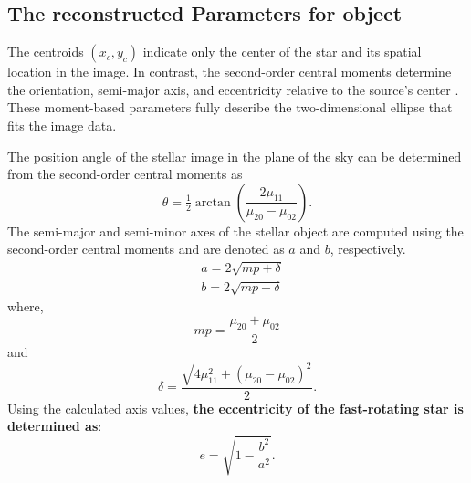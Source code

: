 \subsection{The reconstructed Parameters for object}
The centroids \((x_c, y_c)\) indicate only the center of the star and its spatial location in the image. In contrast, the second-order central moments determine the orientation, semi-major axis, and eccentricity relative to the source's center \citep{teague1980image}. These moment-based parameters fully describe the two-dimensional ellipse that fits the image data.

The position angle of the stellar image in the plane of the sky can be determined from the second-order central moments as
\begin{equation}
	\theta = \tfrac{1}{2}\arctan \left(\frac{2\mu_{11}}{\mu_{20} - \mu_{02}}\right).
	\label{eqn:orn}
\end{equation}
The semi-major and semi-minor axes of the stellar object are computed using the second-order central moments and are denoted as \(a\) and \(b\), respectively.
\begin{equation}
	\begin{aligned}
		&a = 2\sqrt{mp + \delta} \\
		&b = 2\sqrt{mp - \delta}
	\end{aligned}
	\label{eqn:semi}
\end{equation}
where,
\begin{equation}
	mp = \frac{\mu_{20} + \mu_{02}}{2}
	\label{eqn:mp}
\end{equation}
and
\begin{equation}
	\delta = \frac{\sqrt{4\mu_{11}^2 + (\mu_{20} - \mu_{02})^2}}{2}.	
	\label{eqn:delta}
\end{equation}
Using the calculated axis values, {\bf the eccentricity of the fast-rotating star is determined as}:
\begin{equation}
	e=\sqrt{1-\frac{b^2}{a^2}}.
	\label{eqn:eccen}
\end{equation}
